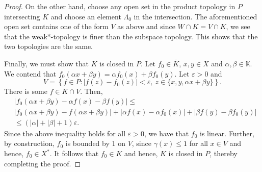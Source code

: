 \documentclass[12pt]{article}
\theoremstyle{thmstyle}
\theoremstyle{defstyle}
\newcommand{\R}{\mathbb{R}}
\newcommand{\bbC}{\mathbb{C}}
\newcommand{\K}{\mathbb{K}} %
\renewcommand{\le}{\leqslant}
\begin{document}
\begin{proof}
    On the other hand, choose any open set in the product topology in $P$ intersecting $K$ and choose an element $\Lambda_0$ in the intersection. The aforementioned open set contains one of the form $V$ as above and since $W\cap K = V\cap K$, we see that the weak*-topology is finer than the subspace topology. This shows that the two topologies are the same.

    Finally, we must show that $K$ is closed in $P$. Let $f_0\in\overline K$, $x,y\in X$ and $\alpha, \beta\in\K$. We contend that $f_0(\alpha x + \beta y) = \alpha f_0(x) + \beta f_0(y)$. Let $\varepsilon > 0$ and 
    \begin{equation*}
        V = \left\{f\in P\colon |f(z) - f_0(z)| < \varepsilon,~z\in\{x, y, \alpha x + \beta y\}\right\}.
    \end{equation*}
    There is some $f\in K\cap V$. Then, 
    \begin{align*}
        &|f_0(\alpha x + \beta y) - \alpha f(x) - \beta f(y)|\le\\
        &|f_0(\alpha x + \beta y) - f(\alpha x + \beta y)| + |\alpha f(x) - \alpha f_0(x)| + |\beta f(y) - \beta f_0(y)|\\
        &\le(|\alpha| + |\beta| + 1)\varepsilon.
    \end{align*}
    Since the above inequality holds for all $\varepsilon > 0$, we have that $f_0$ is linear. Further, by construction, $f_0$ is bounded by $1$ on $V$, since $\gamma(x)\le 1$ for all $x\in V$ and hence, $f_0\in X^\ast$. It follows that $f_0\in K$ and hence, $K$ is closed in $P$, thereby completing the proof.
\end{proof}
\end{document}
